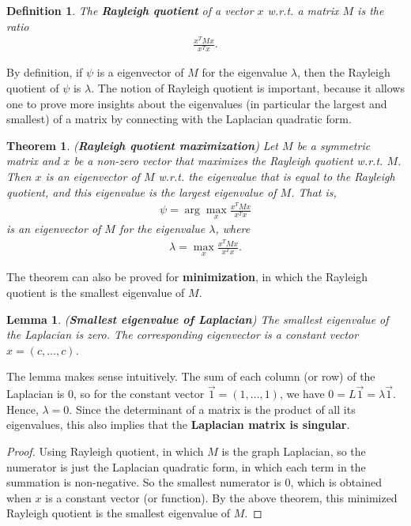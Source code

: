 \documentclass[]{article}
\newtheorem{theorem}{Theorem}[section]
\newtheorem{lemma}{Lemma}[section]
\newtheorem{definition}{Definition}[section] %
\begin{document}
	\begin{definition}
		The \textbf{Rayleigh quotient} of a vector $x$ w.r.t. a matrix $M$ is the ratio 
		\begin{align*}
		\frac{x^T M x}{x^T x}. 
		\end{align*}
	\end{definition}
	By definition, if $\psi$ is a eigenvector of $M$ for the eigenvalue $\lambda$, then the Rayleigh quotient of $\psi$ is $\lambda$. The notion of Rayleigh quotient is important, because it allows one to prove more insights about the eigenvalues (in particular the largest and smallest) of a matrix by connecting with the Laplacian quadratic form. 
	
	\begin{theorem} (\textbf{Rayleigh quotient maximization})
		Let $M$ be a symmetric matrix and $x$ be a non-zero vector that maximizes the Rayleigh quotient w.r.t. $M$. Then $x$ is an eigenvector of $M$ w.r.t. the eigenvalue that is equal to the Rayleigh quotient, and this eigenvalue is the largest eigenvalue of $M$. That is, 
		\begin{align*}
		\psi = \arg\max_{x} \frac{x^T M x}{x^T x}
		\end{align*}
		is an eigenvector of $M$ for the eigenvalue $\lambda$, where 
		\begin{align*}
		\lambda = \max_{x} \frac{x^T M x}{x^T x}.
		\end{align*}
	\end{theorem}
	The theorem can also be proved for \textbf{minimization}, in which the Rayleigh quotient is the smallest eigenvalue of $M$. 
	
	\begin{lemma} (\textbf{Smallest eigenvalue of Laplacian})
		\label{lemma:smallest eigenvalue of laplacian}
		The smallest eigenvalue of the Laplacian is zero. The corresponding eigenvector is a constant vector $x=(c,\dots, c)$.
	\end{lemma}
	The lemma makes sense intuitively. The sum of each column (or row) of the Laplacian is 0, so for the constant vector $\vec{1} = (1, \dots, 1)$, we have $0 = L \vec{1} = \lambda \vec{1}$. Hence, $\lambda=0$. Since the determinant of a matrix is the product of all its eigenvalues, this also implies that the \textbf{Laplacian matrix is singular}. 
	\begin{proof}
		Using Rayleigh quotient, in which $M$ is the graph Laplacian, so the numerator is just the Laplacian quadratic form, in which each term in the summation is non-negative. So the smallest numerator is $0$, which is obtained when $x$ is a constant vector (or function). By the above theorem, this minimized Rayleigh quotient is the smallest eigenvalue of $M$. 
	\end{proof}
	
\end{document}
